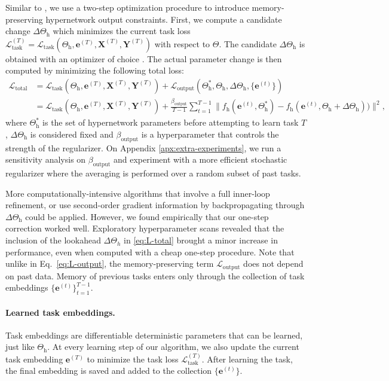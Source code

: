 \documentclass{article}
\begin{document}
Similar to \citet{benjamin_measuring_2018}, we use a two-step optimization procedure to introduce memory-preserving hypernetwork output constraints. First, we compute a candidate change $\Delta \Theta_\text{h}$ which minimizes the current task loss $\mathcal{L}_\text{task}^{(T)} = \mathcal{L}_\text{task} (\Theta_\text{h}, \mathbf{e}^{(T)}, \mathbf{X}^{(T)}, \mathbf{Y}^{(T)})$ with respect to $\Theta$. The candidate $\Delta \Theta_\text{h}$ is obtained with an optimizer of choice \citep[we use Adam throughout;][]{kingma_adam:_2015}. The actual parameter change is then computed by minimizing the following total loss:
\begin{align}
  \mathcal{L}_\text{total} &= \mathcal{L}_\text{task} (\Theta_\text{h}, \mathbf{e}^{(T)}, \mathbf{X}^{(T)}, \mathbf{Y}^{(T)}) + \mathcal{L}_\text{output}(\Theta^*_\text{h},\Theta_\text{h},\Delta \Theta_\text{h}, \{\mathbf{e}^{(t)}\}) \nonumber\\
  &= \mathcal{L}_\text{task} (\Theta_\text{h}, \mathbf{e}^{(T)}, \mathbf{X}^{(T)}, \mathbf{Y}^{(T)}) + \frac{\beta_\text{output}}{T-1} \sum_{t=1}^{T-1} \| f_\text{h}(\mathbf{e}^{(t)}, \Theta_\text{h}^*) - f_\text{h}(\mathbf{e}^{(t)}, \Theta_\text{h} + \Delta \Theta_\text{h} ))\|^2,\label{eq:L-total}
\end{align}
where $\Theta^*_\text{h}$ is the set of hypernetwork parameters before attempting to learn task $T$, $\Delta \Theta_\text{h}$ is considered fixed and $\beta_\text{output}$ is a hyperparameter that controls the strength of the regularizer. On Appendix \ref{apx:extra-experiments}, we run a sensitivity analysis on $\beta_\text{output}$ and experiment with a more efficient stochastic regularizer where the averaging is performed over a random subset of past tasks.

More computationally-intensive algorithms that involve a full inner-loop refinement, or use second-order gradient information by backpropagating through $\Delta \Theta_\text{h}$ could be applied. However, we found empirically that our one-step correction worked well. Exploratory hyperparameter scans revealed that the inclusion of the lookahead $\Delta \Theta_h$ in \eqref{eq:L-total} brought a minor increase in performance, even when computed with a cheap one-step procedure. Note that unlike in Eq.~\ref{eq:L-output}, the memory-preserving term $\mathcal{L}_\text{output}$ does not depend on past data. Memory of previous tasks enters only through the collection of task embeddings $\{ \mathbf{e}^{(t)}\}_{t=1}^{T-1}$.


\paragraph{Learned task embeddings.} Task embeddings are differentiable deterministic parameters that can be learned, just like $\Theta_\text{h}$. At every learning step of our algorithm, we also update the current task embedding $\mathbf{e}^{(T)}$ to minimize the task loss $\mathcal{L}_\text{task}^{(T)}$. After learning the task, the final embedding is saved and added to the collection $\{ \mathbf{e}^{(t)}\}$.
\end{document}
